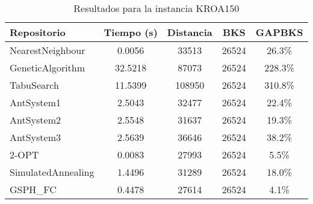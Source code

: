 \begin{table}[H]
\centering
\caption{Resultados para la instancia KROA150}
\begin{tabular}{|l|c|c|c|c|}
\hline
\textbf{Repositorio} & \textbf{Tiempo (s)} & \textbf{Distancia} & \textbf{BKS} & \textbf{GAPBKS} \\ 
\hline
NearestNeighbour & 0.0056 & 33513 & 26524 & 26.3\% \\ 
GeneticAlgorithm & 32.5218 & 87073 & 26524 & 228.3\% \\ 
TabuSearch & 11.5399 & 108950 & 26524 & 310.8\% \\ 
AntSystem1 & 2.5043 & 32477 & 26524 & 22.4\% \\ 
AntSystem2 & 2.5548 & 31637 & 26524 & 19.3\% \\ 
AntSystem3 & 2.5639 & 36646 & 26524 & 38.2\% \\ 
2-OPT & 0.0083 & 27993 & 26524 & 5.5\% \\ 
SimulatedAnnealing & 1.4496 & 31289 & 26524 & 18.0\% \\ 
GSPH_FC & 0.4478 & 27614 & 26524 & 4.1\% \\ 
\hline
\end{tabular}
\end{table}
